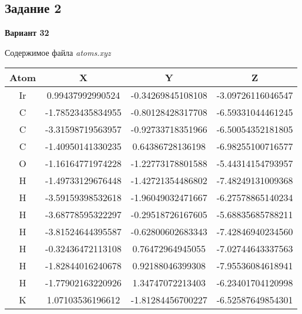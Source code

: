 \documentclass[12pt, a4paper]{report}
\begin{document}
	\subsection*{Задание 2}
	\large
	\begin{center}
		\textbf{Вариант 32}
	\end{center}
	\par
	Содержимое файла \textit{atoms.xyz}
	\begin{center}
		\begin{tabular}{||c|c|c|c||}
			\hline
			Atom & X & Y & Z \\

			\hline
			Ir & 0.99437992990524 & -0.34269845108108 & -3.09726116046547 \\

			\hline
			C & -1.78523435834955 & -0.80128428317708 & -6.59331044461245 \\

			\hline
			C & -3.31598719563957 & -0.92733718351966 & -6.50054352181805 \\

			\hline
			C & -1.40950141330235 & 0.64386728136198  &	-6.98255100716577 \\

			\hline
			O & -1.16164771974228 & -1.22773178801588 &	-5.44314154793957 \\

			\hline
			H & -1.49733129676448 & -1.42721354486802 & -7.48249131009368 \\

			\hline
			H & -3.59159398532618 & -1.96049032471667 & -6.27578865140234 \\

			\hline
			H & -3.68778595322297 & -0.29518726167605 & -5.68835685788211 \\

			\hline
			H & -3.81524644395587 & -0.62800602683343 & -7.42846940234560 \\

			\hline
			H & -0.32436472113108 & 0.76472964945055  & -7.02744643337563 \\

			\hline
			H & -1.82844016240678 & 0.92188046399308  & -7.95536084618941 \\

			\hline
			H & -1.77902163220926 & 1.34747072213403  & -6.23401704120998 \\

			\hline
			K & 1.07103536196612  &	-1.81284456700227 &	-6.52587649854301 \\

			\hline
		\end{tabular}
	\end{center}
\end{document}
